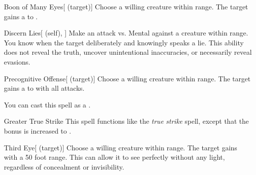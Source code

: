 \lowercase{\hypertarget{spell:Boon of Many Eyes}{}}\label{spell:Boon of Many Eyes}
\begin{attuneability}[\nth{2}]{\hypertarget{spell:Boon of Many Eyes}{Boon of Many Eyes}}[ (target)]
Choose a willing creature within \rngclose range.
The target gains a   to .
\end{attuneability}
\vspace{0.25em}



\lowercase{\hypertarget{spell:Discern Lies}{}}\label{spell:Discern Lies}
\begin{attuneability}[\nth{2}]{\hypertarget{spell:Discern Lies}{Discern Lies}}[ (self), ]
Make an attack vs. Mental against a creature within \rngmed range.
\hit You know when the target deliberately and knowingly speaks a lie.
This ability does not reveal the truth, uncover unintentional inaccuracies, or necessarily reveal evasions.
\end{attuneability}
\vspace{0.25em}



\lowercase{\hypertarget{spell:Precognitive Offense}{}}\label{spell:Precognitive Offense}
\begin{attuneability}[\nth{2}]{\hypertarget{spell:Precognitive Offense}{Precognitive Offense}}[ (target)]
Choose a willing creature within \rngclose range.
The target gains a   to  with all attacks.

You can cast this spell as a .
\end{attuneability}
\vspace{0.25em}



\lowercase{\hypertarget{spell:Greater True Strike}{}}\label{spell:Greater True Strike}
\begin{freeability}[\nth{3}]{\hypertarget{spell:Greater True Strike}{Greater True Strike}}
This spell functions like the \textit{true strike} spell, except that the bonus is increased to .
\end{freeability}
\vspace{0.25em}



\lowercase{\hypertarget{spell:Third Eye}{}}\label{spell:Third Eye}
\begin{attuneability}[\nth{3}]{\hypertarget{spell:Third Eye}{Third Eye}}[ (target)]
Choose a willing creature within \rngclose range.
The target gains  with a 50 foot range.
This can allow it to see perfectly without any light, regardless of concealment or invisibility.
\end{attuneability}
\vspace{0.25em}



